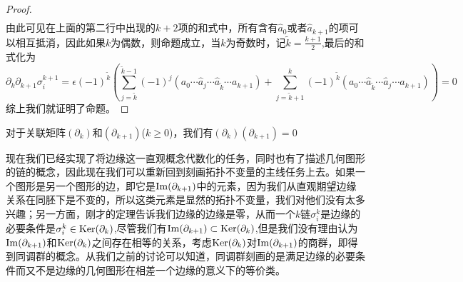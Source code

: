 \begin{proof}
\begin{equation*}
\begin{aligned}
\end{aligned}
\end{equation*}
由此可见在上面的第二行中出现的$k+2$项的和式中，所有含有$\hat{a}_{0}$或者$\hat{a}_{k+1}$的项可以相互抵消，因此如果$k$为偶数，则命题成立，当$k$为奇数时，记$\tilde{k}=\frac{k+1}{2}$,最后的和式化为
\begin{equation*}
     \partial_{k}\partial_{k+1}\sigma^{k+1}_{i}=\epsilon(-1)^{\tilde{k}}\left(\sum\limits_{j=\tilde{k}}^{\tilde{k}-1}(-1)^{j}(a_{0}\cdots\hat{a}_{j}\cdots \hat{a}_{\tilde{k}}\cdots a_{k+1})+\sum\limits_{j=\tilde{k}+1}^{k}(-1)^{\tilde{k}}(a_{0}\cdots\hat{a}_{\tilde{k}}\cdots \hat{a}_{j}\cdots a_{k+1})\right)=0
\end{equation*}
综上我们就证明了命题。
\end{proof}
\begin{corollary}
对于关联矩阵$(\partial_{k})$和$(\partial_{k+1})$($k\geq0$)，我们有$(\partial_{k})(\partial_{k+1})=0$
\end{corollary}
现在我们已经实现了将边缘这一直观概念代数化的任务，同时也有了描述几何图形的链的概念，因此现在我们可以重新回到刻画拓扑不变量的主线任务上去。如果一个图形是另一个图形的边，即它是${\rm Im}(\partial_{k+1})$中的元素，因为我们从直观期望边缘关系在同胚下是不变的，所以这类元素是显然的拓扑不变量，我们对他们没有太多兴趣；另一方面，刚才的定理告诉我们边缘的边缘是零，从而一个$k$链$\sigma^{k}_{i}$是边缘的必要条件是$\sigma^{k}_{i}\in {\rm Ker}(\partial_{k})$,尽管我们有${\rm Im}(\partial_{k+1})\subset {\rm Ker}(\partial_{k})$,但是我们没有理由认为${\rm Im}(\partial_{k+1})$和${\rm Ker}(\partial_{k})$之间存在相等的关系，考虑${\rm Ker}(\partial_{k})$对${\rm Im}(\partial_{k+1})$的商群，即得到同调群的概念。从我们之前的讨论可以知道，同调群刻画的是满足边缘的必要条件而又不是边缘的几何图形在相差一个边缘的意义下的等价类。

